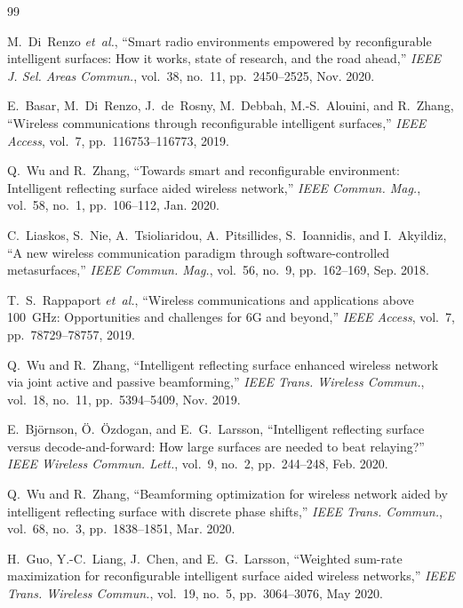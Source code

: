 \documentclass[conference]{IEEEtran}
\begin{document}
\begin{thebibliography}{99}

M.~Di~Renzo \emph{et~al.}, ``Smart radio environments empowered by reconfigurable intelligent surfaces: How it works, state of research, and the road ahead,'' \emph{IEEE J. Sel. Areas Commun.}, vol.~38, no.~11, pp.~2450--2525, Nov. 2020.

E.~Basar, M.~Di~Renzo, J.~de~Rosny, M.~Debbah, M.-S.~Alouini, and R.~Zhang, ``Wireless communications through reconfigurable intelligent surfaces,'' \emph{IEEE Access}, vol.~7, pp.~116753--116773, 2019.

Q.~Wu and R.~Zhang, ``Towards smart and reconfigurable environment: Intelligent reflecting surface aided wireless network,'' \emph{IEEE Commun. Mag.}, vol.~58, no.~1, pp.~106--112, Jan. 2020.

C.~Liaskos, S.~Nie, A.~Tsioliaridou, A.~Pitsillides, S.~Ioannidis, and I.~Akyildiz, ``A new wireless communication paradigm through software-controlled metasurfaces,'' \emph{IEEE Commun. Mag.}, vol.~56, no.~9, pp.~162--169, Sep. 2018.

T.~S.~Rappaport \emph{et~al.}, ``Wireless communications and applications above 100~GHz: Opportunities and challenges for 6G and beyond,'' \emph{IEEE Access}, vol.~7, pp.~78729--78757, 2019.

Q.~Wu and R.~Zhang, ``Intelligent reflecting surface enhanced wireless network via joint active and passive beamforming,'' \emph{IEEE Trans. Wireless Commun.}, vol.~18, no.~11, pp.~5394--5409, Nov. 2019.

E.~Bj\"{o}rnson, \"{O}.~\"{O}zdogan, and E.~G.~Larsson, ``Intelligent reflecting surface versus decode-and-forward: How large surfaces are needed to beat relaying?'' \emph{IEEE Wireless Commun. Lett.}, vol.~9, no.~2, pp.~244--248, Feb. 2020.

Q.~Wu and R.~Zhang, ``Beamforming optimization for wireless network aided by intelligent reflecting surface with discrete phase shifts,'' \emph{IEEE Trans. Commun.}, vol.~68, no.~3, pp.~1838--1851, Mar. 2020.

H.~Guo, Y.-C.~Liang, J.~Chen, and E.~G.~Larsson, ``Weighted sum-rate maximization for reconfigurable intelligent surface aided wireless networks,'' \emph{IEEE Trans. Wireless Commun.}, vol.~19, no.~5, pp.~3064--3076, May 2020.


\end{thebibliography}
\end{document}
